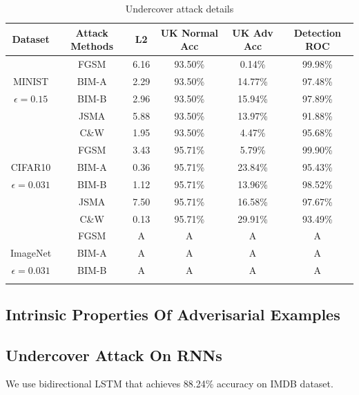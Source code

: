\documentclass{article}
\begin{document}
\begin{table}[htbp]
	\centering
	\begin{tabular}{cccccc}
		\hline
		Dataset           & Attack Methods  & L2   & UK Normal Acc & UK Adv Acc & Detection ROC \\ \hline
		                  & FGSM            & 6.16 & 93.50\%       & 0.14\%     & 99.98\% \\
    MINIST            & BIM-A           & 2.29 & 93.50\%       & 14.77\%    & 97.48\% \\
		$\epsilon=0.15$   & BIM-B           & 2.96 & 93.50\%       & 15.94\%    & 97.89\% \\
                      & JSMA            & 5.88 & 93.50\%       & 13.97\%    & 91.88\% \\
                      & C\&W            & 1.95 & 93.50\%       & 4.47\%     & 95.68\% \\\hline
                      & FGSM            & 3.43 & 95.71\%       & 5.79\%     & 99.90\% \\
		CIFAR10           & BIM-A           & 0.36 & 95.71\%       & 23.84\%    & 95.43\% \\
		$\epsilon=0.031$  & BIM-B           & 1.12 & 95.71\%       & 13.96\%    & 98.52\% \\
                      & JSMA            & 7.50 & 95.71\%       & 16.58\%    & 97.67\% \\
                      & C\&W            & 0.13 & 95.71\%       & 29.91\%    & 93.49\% \\\hline
		                  & FGSM            & A & A & A & A \\
    ImageNet          & BIM-A           & A & A & A & A \\
    $\epsilon=0.031$  & BIM-B           & A & A & A & A \\ \hline
    \\
  \end{tabular}
	\caption{ Undercover attack details}  
\end{table}



\subsection{Intrinsic Properties Of Adverisarial Examples}


\subsection{Undercover Attack On RNNs}
We use bidirectional LSTM that achieves 88.24\% accuracy on IMDB dataset.
\end{document}

